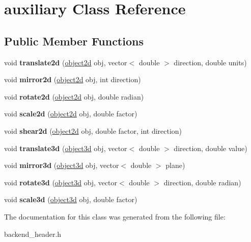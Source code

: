 \hypertarget{classauxiliary}{}\section{auxiliary Class Reference}
\label{classauxiliary}
\subsection*{Public Member Functions}
\begin{DoxyCompactItemize}
\item 
void {\bfseries translate2d} (\hyperlink{classobject2d}{object2d} obj, vector$<$ double $>$ direction, double units)\hypertarget{classauxiliary_aad780e2b2b06f034da5940106573403e}{}\label{classauxiliary_aad780e2b2b06f034da5940106573403e}

\item 
void {\bfseries mirror2d} (\hyperlink{classobject2d}{object2d} obj, int direction)\hypertarget{classauxiliary_aad2eb20c84d63814e01851d13c2f391c}{}\label{classauxiliary_aad2eb20c84d63814e01851d13c2f391c}

\item 
void {\bfseries rotate2d} (\hyperlink{classobject2d}{object2d} obj, double radian)\hypertarget{classauxiliary_a677e3bb70dcd69ab7de7d90f435d06d3}{}\label{classauxiliary_a677e3bb70dcd69ab7de7d90f435d06d3}

\item 
void {\bfseries scale2d} (\hyperlink{classobject2d}{object2d} obj, double factor)\hypertarget{classauxiliary_a38835e6e55a85ca7b2f30dda9fb18ba2}{}\label{classauxiliary_a38835e6e55a85ca7b2f30dda9fb18ba2}

\item 
void {\bfseries shear2d} (\hyperlink{classobject2d}{object2d} obj, double factor, int direction)\hypertarget{classauxiliary_a802658ef07a2a749962de73d6e836f76}{}\label{classauxiliary_a802658ef07a2a749962de73d6e836f76}

\item 
void {\bfseries translate3d} (\hyperlink{classobject3d}{object3d} obj, vector$<$ double $>$ direction, double value)\hypertarget{classauxiliary_ad85868aa5b33d05ecf01887f537ae3c8}{}\label{classauxiliary_ad85868aa5b33d05ecf01887f537ae3c8}

\item 
void {\bfseries mirror3d} (\hyperlink{classobject3d}{object3d} obj, vector$<$ double $>$ plane)\hypertarget{classauxiliary_a2e70ba8ba76cf36bed9018c4276b368a}{}\label{classauxiliary_a2e70ba8ba76cf36bed9018c4276b368a}

\item 
void {\bfseries rotate3d} (\hyperlink{classobject3d}{object3d} obj, vector$<$ double $>$ direction, double radian)\hypertarget{classauxiliary_abce9263f052db4127cb6935a0a135b84}{}\label{classauxiliary_abce9263f052db4127cb6935a0a135b84}

\item 
void {\bfseries scale3d} (\hyperlink{classobject3d}{object3d} obj, double factor)\hypertarget{classauxiliary_a85ed61c481b9e7b16e85748f62ef3346}{}\label{classauxiliary_a85ed61c481b9e7b16e85748f62ef3346}

\end{DoxyCompactItemize}


The documentation for this class was generated from the following file\+:\begin{DoxyCompactItemize}
\item 
backend\+\_\+header.\+h\end{DoxyCompactItemize}
